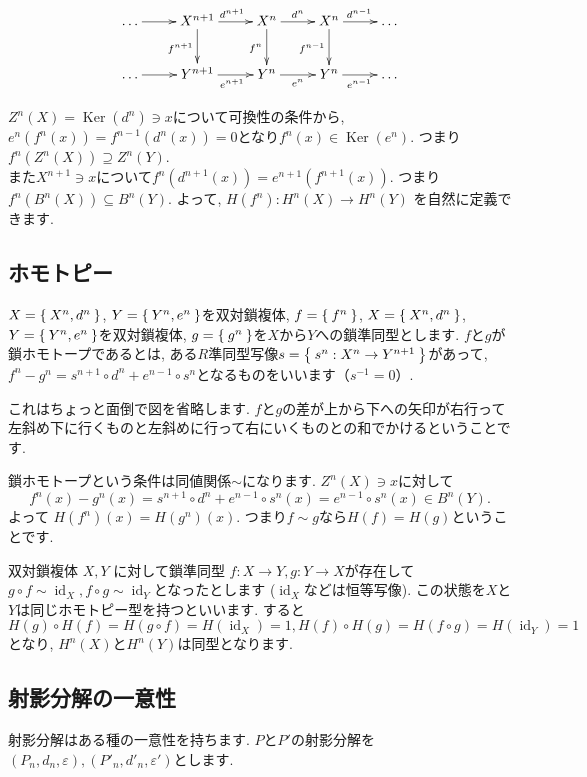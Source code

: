 \documentclass{jsarticle}
\newcommand{\makeop}[1]{\mathop{\mathrm{#1}}\nolimits}
\def\Ker{\makeop{Ker}}
\def\id{\makeop{id}}
\theoremstyle{definition}
\numberwithin{theorem}{section}
\begin{document}
\begin{equation*}
\xymatrix{
  \ldots \ar[r] & X^{n+1} \ar[r]^{d^{n+1}} \ar[d]_{f^{n+1}} & X^{n} \ar[r]^{d^n} \ar[d]_{f^{n}} & X^n \ar[r]^{d^{n-1}} \ar[d]_{f^{n-1}} & \ldots\\
  \ldots \ar[r] & Y^{n+1} \ar[r]_{e^{n+1}} & Y^{n} \ar[r]_{e^n} & Y^n \ar[r]_{e^{n-1}} & \ldots\\
}
\end{equation*}

$Z^n(X) = \Ker(d^n)\ni x$について可換性の条件から, $e^n(f^n(x)) = f^{n-1}(d^n(x)) = 0$となり$f^n(x) \in \Ker(e^n)$. つまり
$f^n(Z^n(X))\supseteq Z^n(Y)$.\\
また$X^{n+1}\ni x$について$f^n(d^{n+1}(x)) = e^{n+1}(f^{n+1}(x))$. つまり$f^n(B^n(X))\subseteq B^n(Y)$. よって, 
$H(f^n): H^n(X) \rightarrow H^n(Y)$ を自然に定義できます.

\subsection{ホモトピー}
\label{sc:homotopy}
$X=\Set{X^n, d^n}$, $Y = \Set{Y^n, e^n}$を双対鎖複体, $f=\Set{f^n}$, $X=\Set{X^n, d^n}$, $Y = \Set{Y^n, e^n}$を双対鎖複体,
$g=\Set{g^n}$を$X$から$Y$への鎖準同型とします. $f$と$g$が鎖ホモトープであるとは, ある$R$準同型写像$s=\Set{s^n: X^n\rightarrow Y^{n+1}}$があって, 
$f^n-g^n = s^{n+1} \circ d^n+e^{n-1} \circ s^n$となるものをいいます（$s^{-1} = 0$）.

これはちょっと面倒で図を省略します. $f$と$g$の差が上から下への矢印が右行って左斜め下に行くものと左斜めに行って右にいくものとの和でかけるということです.

鎖ホモトープという条件は同値関係$\sim$になります.
$Z^n(X) \ni x$に対して
\[
f^n(x) - g^n(x) = s^{n+1} \circ d^n + e^{n-1}\circ s^n(x) = e^{n-1}\circ s^n(x) \in B^n(Y).
\]
よって $H(f^n)(x) = H(g^n)(x)$. つまり$f\sim g$なら$H(f) = H(g)$ということです.

双対鎖複体 $X, Y$ に対して鎖準同型 $f: X\rightarrow Y, g: Y\rightarrow X$が存在して $g\circ f \sim \id_X, f\circ g \sim \id_Y$となったとします
($\id_X$などは恒等写像). この状態を$X$と$Y$は同じホモトピー型を持つといいます. すると
\[
H(g)\circ H(f) = H(g\circ f) = H(\id_X) = 1, H(f)\circ H(g) = H(f\circ g) = H(\id_Y) = 1
\]
となり,  $H^n(X)$と$H^n(Y)$は同型となります. 

\subsection{射影分解の一意性}
射影分解はある種の一意性を持ちます. $P$と$P'$の射影分解を$(P_n, d_n, \varepsilon), (P'_n, d'_n, \varepsilon')$とします.
\end{document}
